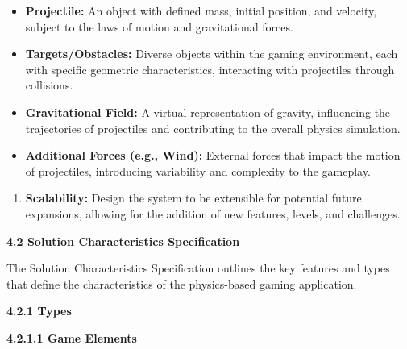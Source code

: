 \documentclass[
]{article}
\begin{document}
\begin{itemize}
\item
  \textbf{Projectile:} An object with defined mass, initial position,
  and velocity, subject to the laws of motion and gravitational forces.
\item
  \textbf{Targets/Obstacles:} Diverse objects within the gaming
  environment, each with specific geometric characteristics, interacting
  with projectiles through collisions.
\item
  \textbf{Gravitational Field:} A virtual representation of gravity,
  influencing the trajectories of projectiles and contributing to the
  overall physics simulation.
\item
  \textbf{Additional Forces (e.g., Wind):} External forces that impact
  the motion of projectiles, introducing variability and complexity to
  the gameplay.
\end{itemize}

\begin{enumerate}
\def\labelenumi{\arabic{enumi}.}
\item
  \textbf{Scalability:} Design the system to be extensible for potential
  future expansions, allowing for the addition of new features, levels,
  and challenges.
\end{enumerate}

\protect\hypertarget{qrrrrrr}{}{}\textbf{4.2 Solution Characteristics
Specification}

The Solution Characteristics Specification outlines the key features and
types that define the characteristics of the physics-based gaming
application.

\protect\hypertarget{qrrrrrrr}{}{}\textbf{4.2.1 Types}

\textbf{4.2.1.1 Game Elements}
\end{document}
